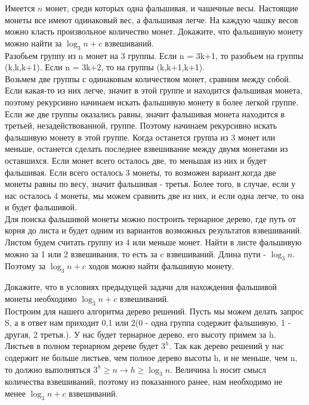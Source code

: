 \documentclass[12pt]{extreport}
\theoremstyle{definiton}
\theoremstyle{definition}
\theoremstyle{definition}
\let\geq\geqslant
\begin{document}
	\Pr[2] Имеется $n$ монет, среди которых одна фальшивая, и чашечные весы.
	Настоящие монеты все имеют одинаковый вес, а фальшивая легче. На каждую чашку весов можно класть произвольное количество монет.
	Докажите, что фальшивую монету можно найти за $\log_3 n+c$ взвешиваний.
	\newline
	\\ Разобьем группу из n монет на 3 группы. Если n = 3k+1, то разобьем на группы (k,k,k+1). Если n = 3k+2, то на группы (k,k+1,k+1). 
	\\ Возьмем две группы с одинаковым количеством монет, сравним между собой. Если какая-то из них легче, значит в этой группе и находится фальшивая монета, поэтому рекурсивно начинаем искать фальшивую монету в более легкой группе. Если же две группы оказались равны, значит фальшивая монета находится в третьей, незадействованной, группе. Поэтому начинаем рекурсивно искать фальшивую монету в этой группе. Когда останется группа из 3 монет или меньше, останется сделать последнее взвешивание между двумя монетами из оставшихся. Если монет всего осталось две, то меньшая из них и будет фальшивая. Если всего осталось 3 монеты, то возможен вариант,когда две монеты равны по весу, значит фальшивая - третья. Более того, в случае, если у нас осталось 4 монеты, мы можем сравнить две из них, и если одна легче, то она и будет фальшивой.
	\\ Для поиска фальшивой монеты можно построить тернарное дерево, где путь от корня до листа и будет одним из вариантов возможных результатов взвешиваний. Листом будем считать группу из 4 или меньше монет. Найти в листе фальшивую можно за 1 или 2 взвешивания, то есть за c взвешиваний. Длина пути - $\log_3n$. Поэтому за $\log_3 n + c$ ходов можно найти фальшивую монету.

	\Pr[3] Докажите, что в условиях предыдущей задачи для нахождения фальшивой
	монеты необходимо $\log_3 n + c$ взвешиваний.
	\newline
	\\ Построим для нашего алгоритма дерево решений. Пусть мы можем делать запрос S, а в ответ нам приходит 0,1 или 2(0 - одна группа содержит фальшивую, 1 - другая, 2 третья.). У нас будет тернарное дерево, его высоту примем за h. Листьев в полном тернарном дереве будет $3^h$. Так как дерево решений у нас содержит не больше листьев, чем полное дерево высоты h, и не меньше, чем n, то должно выполняться $3^h \geq n \to h \geq \log_3n$. Величина h носит смысл количества взвешиваний, поэтому из показанного ранее, нам необходимо не менее $\log_3 n + c$ взвешиваний.
\end{document}
